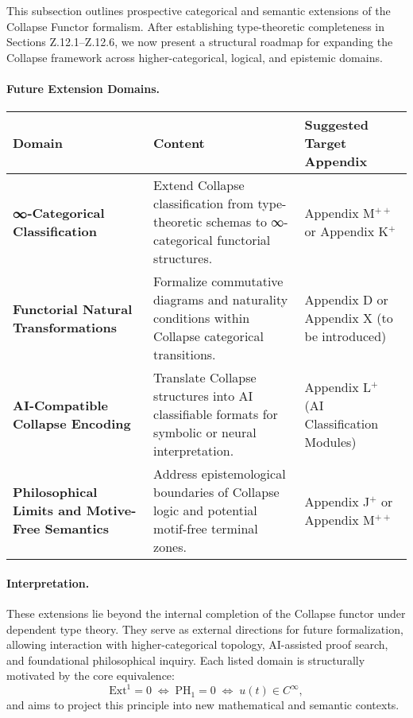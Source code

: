 \documentclass[11pt]{article}
\begin{document}
\begin{axiom}
\begin{axiom}
{{This subsection outlines prospective categorical and semantic extensions of the Collapse Functor formalism.  
After establishing type-theoretic completeness in Sections Z.12.1–Z.12.6, we now present a structural roadmap  
for expanding the Collapse framework across higher-categorical, logical, and epistemic domains.

\paragraph{Future Extension Domains.}
\begin{center}
\renewcommand{\arraystretch}{1.4}
\begin{tabular}{|p{4.5cm}|p{6.5cm}|p{4.8cm}|}
\hline
\textbf{Domain} & \textbf{Content} & \textbf{Suggested Target Appendix} \\
\hline
\textbf{∞-Categorical Classification} & Extend Collapse classification from type-theoretic schemas to ∞-categorical functorial structures. & Appendix M$^{++}$ or Appendix K$^+$ \\
\hline
\textbf{Functorial Natural Transformations} & Formalize commutative diagrams and naturality conditions within Collapse categorical transitions. & Appendix D or Appendix X (to be introduced) \\
\hline
\textbf{AI-Compatible Collapse Encoding} & Translate Collapse structures into AI classifiable formats for symbolic or neural interpretation. & Appendix L$^+$ (AI Classification Modules) \\
\hline
\textbf{Philosophical Limits and Motive-Free Semantics} & Address epistemological boundaries of Collapse logic and potential motif-free terminal zones. & Appendix J$^+$ or Appendix M$^{++}$ \\
\hline
\end{tabular}
\end{center}

\paragraph{Interpretation.}
These extensions lie beyond the internal completion of the Collapse functor under dependent type theory.  
They serve as external directions for future formalization, allowing interaction with higher-categorical topology,  
AI-assisted proof search, and foundational philosophical inquiry.  
Each listed domain is structurally motivated by the core equivalence:
\[
\mathrm{Ext}^1 = 0 \;\Longleftrightarrow\; \mathrm{PH}_1 = 0 \;\Longleftrightarrow\; u(t) \in C^\infty,
\]
and aims to project this principle into new mathematical and semantic contexts.




}}
\end{axiom}
\end{axiom}
\end{document}
